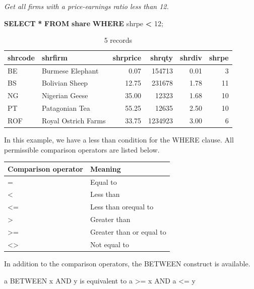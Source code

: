 \documentclass[
]{article}
\newenvironment{Shaded}{\begin{snugshade}}{\end{snugshade}}
\newcommand{\DecValTok}[1]{\textcolor[rgb]{0.00,0.00,0.81}{#1}}
\newcommand{\KeywordTok}[1]{\textcolor[rgb]{0.13,0.29,0.53}{\textbf{#1}}}
\newcommand{\NormalTok}[1]{#1}
\newcommand{\OperatorTok}[1]{\textcolor[rgb]{0.81,0.36,0.00}{\textbf{#1}}}
\begin{document}
\emph{Get all firms with a price-earnings ratio less than 12.}

\begin{Shaded}
\begin{Highlighting}[]
\KeywordTok{SELECT} \OperatorTok{*} \KeywordTok{FROM} \KeywordTok{share} \KeywordTok{WHERE}\NormalTok{ shrpe }\OperatorTok{\textless{}} \DecValTok{12}\NormalTok{;}
\end{Highlighting}
\end{Shaded}

\begin{table}

\caption{\label{tab:unnamed-chunk-8}5 records}
\centering
\begin{tabular}[t]{l|l|r|r|r|r}
\hline
shrcode & shrfirm & shrprice & shrqty & shrdiv & shrpe\\
\hline
BE & Burmese Elephant & 0.07 & 154713 & 0.01 & 3\\
\hline
BS & Bolivian Sheep & 12.75 & 231678 & 1.78 & 11\\
\hline
NG & Nigerian Geese & 35.00 & 12323 & 1.68 & 10\\
\hline
PT & Patagonian Tea & 55.25 & 12635 & 2.50 & 10\\
\hline
ROF & Royal Ostrich Farms & 33.75 & 1234923 & 3.00 & 6\\
\hline
\end{tabular}
\end{table}

In this example, we have a less than condition for the WHERE clause. All permissible comparison operators are listed below.

\begin{longtable}[]{@{}ll@{}}
\toprule
Comparison operator & Meaning \\
\midrule
\endhead
= & Equal to \\
\textless{} & Less than \\
\textless= & Less than orequal to \\
\textgreater{} & Greater than \\
\textgreater= & Greater than or equal to \\
\textless\textgreater{} & Not equal to \\
\bottomrule
\end{longtable}

In addition to the comparison operators, the BETWEEN construct is available.

a BETWEEN x AND y is equivalent to a \textgreater= x AND a \textless= y
\end{document}
